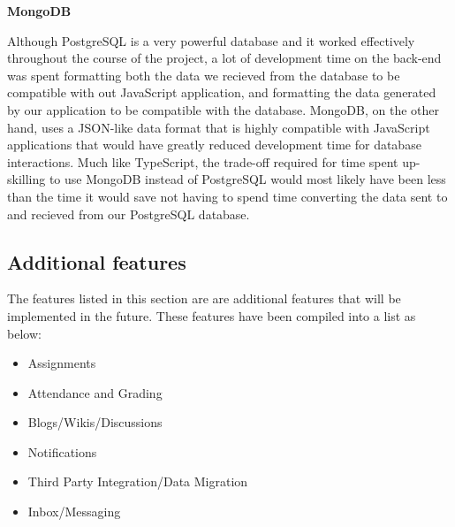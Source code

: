 \textbf{MongoDB}

Although PostgreSQL is a very powerful database and it worked effectively throughout the course of the project, a lot of development time on the back-end was spent formatting both the data we recieved from the database to be compatible with out JavaScript application, and formatting the data generated by our application to be compatible with the database. MongoDB, on the other hand, uses a JSON-like data format that is highly compatible with JavaScript applications that would have greatly reduced development time for database interactions. Much like TypeScript, the trade-off required for time spent up-skilling to use MongoDB instead of PostgreSQL would most likely have been less than the time it would save not having to spend time converting the data sent to and recieved from our PostgreSQL database.

\subsection{Additional features}
The features listed in this section are are additional features that will be implemented in the future. These features have been compiled into a list as below: 

\begin{itemize}
  \item Assignments
  \item Attendance and Grading
  \item Blogs/Wikis/Discussions
  \item Notifications
  \item Third Party Integration/Data Migration
  \item Inbox/Messaging
\end{itemize}
